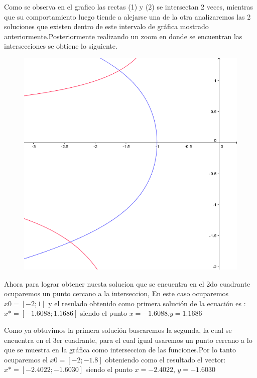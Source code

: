\documentclass{udparticle}
\begin{document}
\begin{enumerate}
            Como se observa en el grafico las rectas (1) y (2) se intersectan 2 veces, mientras que su comportamiento luego tiende a alejarse una de la otra analizaremos las 2 soluciones que existen dentro de este intervalo de gráfica mostrado anteriormente.Posteriormente realizando un zoom en donde se encuentran las intersecciones se obtiene lo siguiente.\\
            
            \begin{figure}[H]
               \centering   \includegraphics[width=13cm]{GraficoEcEj1azoom}
            \end{figure}
            Ahora para lograr obtener nuesta solucion que se encuentra en el 2do cuadrante  ocuparemos un punto cercano a la interseccion, En este caso ocuparemos $ x0=[-2;1] $ y el resulado obtenido como primera solución de la ecuación es :
            $ x*=[-1.6088;1.1686 ]$ siendo el punto  $x = -1.6088$,$y = 1.1686$
            
            Como ya obtuvimos la primera solución buscaremos la segunda, la cual se encuentra en el 3er cuadrante, para el cual igual usaremos un punto cercano a lo que se muestra en la gráfica como interseccion de las funciones.Por lo tanto ocuparemos el $x0=[-2;-1.8] $ obteniendo como el resultado el vector:
            $x*=[-2.4022;-1.6030]$ siendo el punto $x=-2.4022$, $y=-1.6030$


\end{enumerate}
\end{document}
